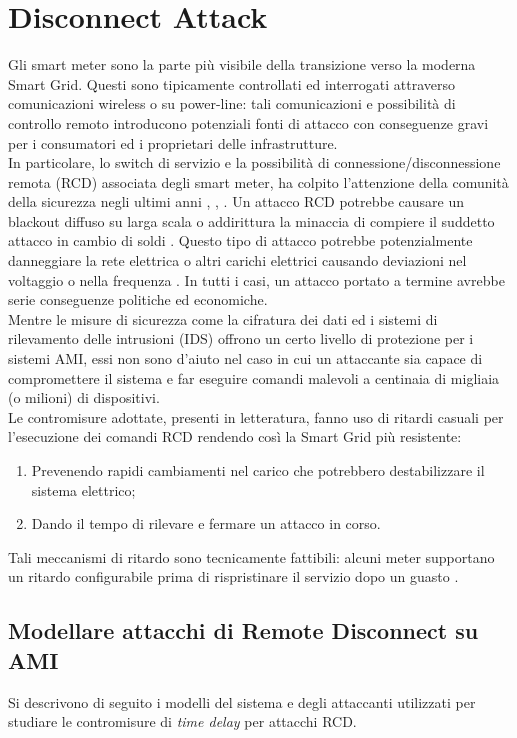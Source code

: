 \section{Disconnect Attack}
Gli smart meter sono la parte più visibile della transizione verso la moderna Smart Grid. Questi sono tipicamente controllati ed interrogati attraverso comunicazioni wireless o su power-line: tali comunicazioni e possibilità di controllo remoto introducono potenziali fonti di attacco con conseguenze gravi per i consumatori ed i proprietari delle infrastrutture.\\
In particolare, lo switch di servizio e la possibilità di connessione/disconnessione remota (RCD) associata degli smart meter, ha colpito l'attenzione della comunità della sicurezza negli ultimi anni \cite{offswitch}, \cite{remotecontrol}, \cite{amithreats}. Un attacco RCD potrebbe causare un blackout diffuso su larga scala o addirittura la minaccia di compiere il suddetto attacco in cambio di soldi \cite{offswitch}. Questo tipo di attacco potrebbe potenzialmente danneggiare la rete elettrica o altri carichi elettrici causando deviazioni nel voltaggio o nella frequenza \cite{remotecontrol}. In tutti i casi, un attacco portato a termine avrebbe serie conseguenze politiche ed economiche.\\
Mentre le misure di sicurezza come la cifratura dei dati ed i sistemi di rilevamento delle intrusioni (IDS) offrono un certo livello di protezione per i sistemi AMI, essi non sono d'aiuto nel caso in cui un attaccante sia capace di compromettere il sistema e far eseguire comandi malevoli a centinaia di migliaia (o milioni) di dispositivi.\\
Le contromisure adottate, presenti in letteratura, fanno uso di ritardi casuali per l'esecuzione dei comandi RCD rendendo così la Smart Grid più resistente:\\
\begin{enumerate}
	\item Prevenendo rapidi cambiamenti nel carico che potrebbero destabilizzare il sistema elettrico;
	\item Dando il tempo di rilevare e fermare un attacco in corso.
\end{enumerate}
Tali meccanismi di ritardo sono tecnicamente fattibili: alcuni meter supportano un ritardo configurabile prima di rispristinare il servizio dopo un guasto \cite{disconnectfaqs}.
\subsection{Modellare attacchi di Remote Disconnect su AMI}
Si descrivono di seguito i modelli del sistema e degli attaccanti utilizzati per studiare le contromisure di \emph{time delay} per attacchi RCD.
